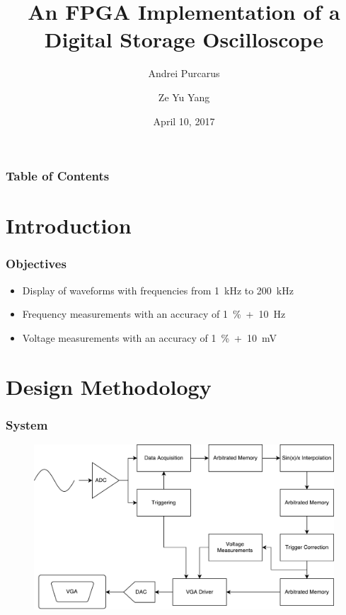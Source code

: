 \documentclass[pdf]{beamer}
\title{\textbf{An FPGA Implementation of a \\ Digital Storage Oscilloscope}}
\author{
    Andrei Purcarus \and Ze Yu Yang
}
\institute{
  ECSE 487 \\
  McGill University
}
\date{April 10, 2017}
\begin{document}
\maketitle

\begin{frame}
\frametitle{Table of Contents}
\tableofcontents
\end{frame}

\section{Introduction}

\begin{frame}
\frametitle{Objectives}
\begin{itemize}
\item Display of waveforms with frequencies from 1~kHz to 200~kHz
\item Frequency measurements with an accuracy of 1~\%~+~10~Hz
\item Voltage measurements with an accuracy of 1~\%~+~10~mV
\end{itemize}
\end{frame}

\section{Design Methodology}

\begin{frame}
\frametitle{System}
\begin{figure}[!htb]
  \includegraphics[width=\linewidth]{diagrams/system.pdf}
\end{figure}
\end{frame}
\end{document}
